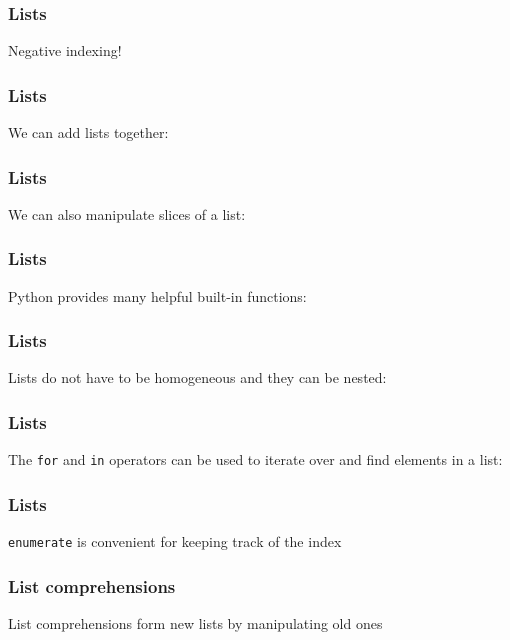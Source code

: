 \documentclass{beamer}
\begin{document}
\begin{frame}
\frametitle{Lists}


Negative indexing!

\end{frame}

\begin{frame}
\frametitle{Lists}

We can add lists together:

\end{frame}

\begin{frame}
\frametitle{Lists}
We can also manipulate slices of a list:


\end{frame}

\begin{frame}
\frametitle{Lists}
Python provides many helpful built-in functions:


\end{frame}

\begin{frame}
\frametitle{Lists}

Lists do not have to be homogeneous and they can be nested:


\end{frame}


\begin{frame}
\frametitle{Lists}

The \texttt{for} and \texttt{in} operators can be used to iterate over and find elements in a list:


\end{frame}

\begin{frame}
\frametitle{Lists}

\texttt{enumerate} is convenient for keeping track of the index


\end{frame}


\begin{frame}
\frametitle{List comprehensions}

List comprehensions form new lists by manipulating old ones


\end{frame}
\end{document}
